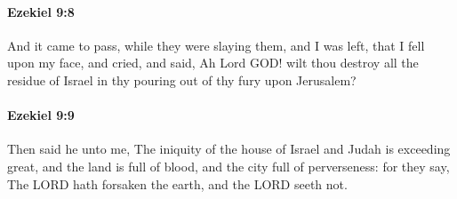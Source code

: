 		\paragraph{Ezekiel 9:8} %
			\label{EZEKIEL-9-8}

			And it came to pass, while they were slaying them, and I was left, that I fell upon my face, and cried, and said, Ah Lord GOD! wilt thou destroy all the residue of Israel in thy pouring out of thy fury upon Jerusalem?


		\paragraph{Ezekiel 9:9} %
			\label{EZEKIEL-9-9}

			Then said he unto me, The iniquity of the house of Israel and Judah is exceeding great, and the land is full of blood, and the city full of perverseness: for they say, The LORD hath forsaken the earth, and the LORD seeth not.

